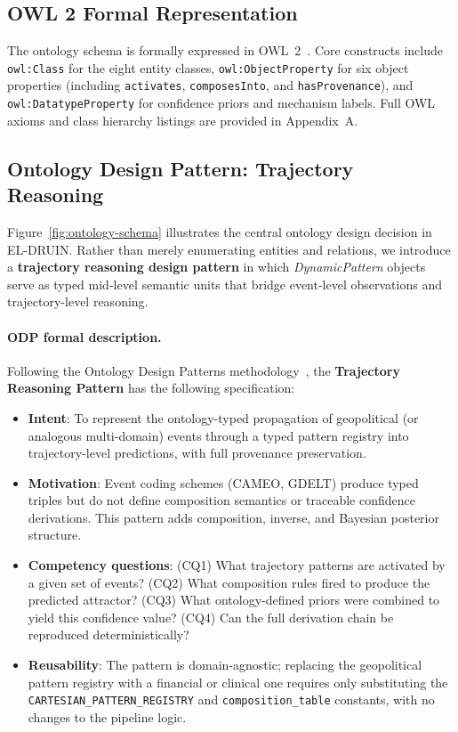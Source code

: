 \documentclass{llncs}
\begin{document}
\subsection{OWL 2 Formal Representation}
\label{sec:owl-representation}

The ontology schema is formally expressed in OWL~2~\cite{grau2008owl2,w3c2012owl2}.
Core constructs include \texttt{owl:Class} for the eight entity classes,
\texttt{owl:ObjectProperty} for six object properties (including
\texttt{activates}, \texttt{composesInto}, and \texttt{hasProvenance}),
and \texttt{owl:DatatypeProperty} for confidence priors and mechanism labels.
Full OWL axioms and class hierarchy listings are provided in Appendix~A.

\subsection{Ontology Design Pattern: Trajectory Reasoning}
\label{sec:design-pattern}

Figure~\ref{fig:ontology-schema} illustrates the central ontology design
decision in EL-DRUIN. Rather than merely enumerating entities and relations,
we introduce a \textbf{trajectory reasoning design pattern} in which
\emph{DynamicPattern} objects serve as typed mid-level semantic units that
bridge event-level observations and trajectory-level reasoning.

\paragraph{ODP formal description.}
Following the Ontology Design Patterns methodology~\cite{gangemi2005odp,gangemi2010odp},
the \textbf{Trajectory Reasoning Pattern} has the following specification:
\begin{itemize}[noitemsep,topsep=2pt]
  \item \textbf{Intent}: To represent the ontology-typed propagation of geopolitical
    (or analogous multi-domain) events through a typed pattern registry into
    trajectory-level predictions, with full provenance preservation.
  \item \textbf{Motivation}: Event coding schemes (CAMEO, GDELT) produce typed triples
    but do not define composition semantics or traceable confidence derivations.
    This pattern adds composition, inverse, and Bayesian posterior structure.
  \item \textbf{Competency questions}:
    (CQ1) What trajectory patterns are activated by a given set of events?
    (CQ2) What composition rules fired to produce the predicted attractor?
    (CQ3) What ontology-defined priors were combined to yield this confidence value?
    (CQ4) Can the full derivation chain be reproduced deterministically?
  \item \textbf{Reusability}: The pattern is domain-agnostic; replacing the
    geopolitical pattern registry with a financial or clinical one requires only
    substituting the \texttt{CARTESIAN\_PATTERN\_REGISTRY} and \texttt{composition\_table}
    constants, with no changes to the pipeline logic.
\end{itemize}
\end{document}
